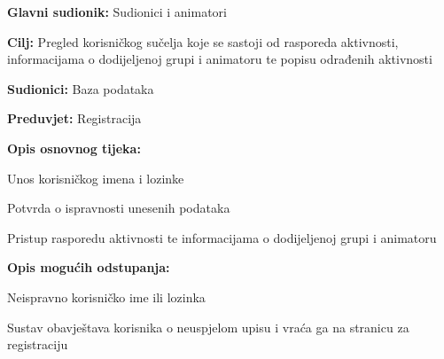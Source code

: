 \noindent {}
\begin{packed_item}

	\item \textbf{Glavni sudionik: }Sudionici i animatori
	\item  \textbf{Cilj:} Pregled korisničkog sučelja koje se sastoji od rasporeda aktivnosti,                 informacijama o dodijeljenoj grupi i animatoru te popisu odrađenih aktivnosti
	\item  \textbf{Sudionici:} Baza podataka
	\item  \textbf{Preduvjet:} Registracija
	\item  \textbf{Opis osnovnog tijeka:}

	\item[] \begin{packed_enum}

				\item Unos korisničkog imena i lozinke
				\item Potvrda o ispravnosti unesenih podataka
				\item Pristup rasporedu aktivnosti te informacijama o dodijeljenoj grupi i animatoru
	\end{packed_enum}

	\item  \textbf{Opis mogućih odstupanja:}

	\item[] \begin{packed_item}

				\item[2.a] Neispravno korisničko ime ili lozinka
				\item[] \begin{packed_enum}

							\item Sustav obavještava korisnika o neuspjelom upisu i vraća ga na stranicu za registraciju


				\end{packed_enum}
	\end{packed_item}
\end{packed_item}
\vspace{5mm} %

